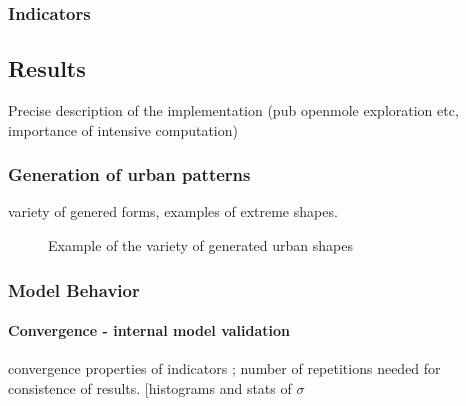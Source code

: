 \subsubsection{Indicators}




\subsection{Results}


Precise description of the implementation (pub openmole exploration etc, importance of intensive computation)


\subsubsection{Generation of urban patterns}

variety of genered forms, examples of extreme shapes.














\begin{figure}

\caption{Example of the variety of generated urban shapes}
\end{figure}




\subsubsection{Model Behavior}


\paragraph{Convergence - internal model validation}

convergence properties of indicators ; number of repetitions needed for consistence of results. [histograms and stats of $\sigma$ %

